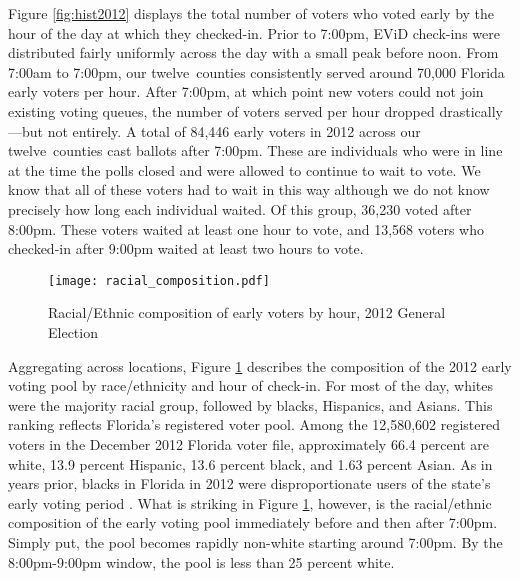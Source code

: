 \documentclass[12pt,titlepage]{article}
\newcommand{\numcounties}{twelve}
\begin{document}
Figure \ref{fig:hist2012} displays the total number of voters who
voted early by the hour of the day at which they checked-in. Prior to
7:00pm, EViD check-ins were distributed fairly uniformly across the
day with a small peak before noon.  From 7:00am to 7:00pm, our
\numcounties\ counties consistently served around 70,000 Florida early
voters per hour. After 7:00pm, at which point new voters could not
join existing voting queues, the number of voters served per hour
dropped drastically---but not entirely.  A total of 84,446 early
voters in 2012 across our \numcounties\ counties cast ballots after
7:00pm. These are individuals who were in line at the time the polls
closed and were allowed to continue to wait to vote.  We know that all
of these voters had to wait in this way although we do not know
precisely how long each individual waited.  Of this group, 36,230
voted after 8:00pm.  These voters waited at least one hour to vote,
and 13,568 voters who checked-in after 9:00pm waited at least two
hours to vote.



\begin{figure}[!ht]
\caption{Racial/Ethnic composition of early voters by hour, 2012 General Election}
  \label{fig:race2012}
  \centering
    \centering\texttt{[image: racial\_composition.pdf]}
\end{figure}

Aggregating across locations, Figure \ref{fig:race2012} describes the
composition of the 2012 early voting pool by race/ethnicity and hour
of check-in.  For most of the day, whites were the majority racial
group, followed by blacks, Hispanics, and Asians.  This ranking
reflects Florida's registered voter pool.  Among the 12,580,602
registered voters in the December 2012 Florida voter file,
approximately 66.4 percent are white, 13.9 percent Hispanic, 13.6
percent black, and 1.63 percent Asian.  As in years prior, blacks in
Florida in 2012 were disproportionate users of the state's early
voting period \citep{herronsmith:souls}.  What is striking in Figure
\ref{fig:race2012}, however, is the racial/ethnic composition of the
early voting pool immediately before and then after 7:00pm.  Simply
put, the pool becomes rapidly non-white starting around 7:00pm.  By
the 8:00pm-9:00pm window, the pool is less than 25 percent white.
\end{document}

